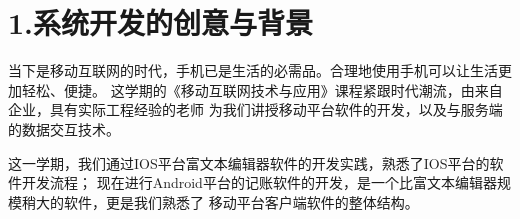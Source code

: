 \documentclass{article}
\begin{document}
\begin{mdtoc}
\begin{mdtocblock}
\begin{mdtocblock}

\begin{mdtocblock}%





\end{mdtocblock}%
\end{mdtocblock}%


\end{mdtocblock}%
\end{mdtoc}%

\mdhr{}%

\section{1.\hspace*{0.5em}系统开发的创意与背景}\label{section}%

\noindent{}当下是移动互联网的时代，手机已是生活的必需品。合理地使用手机可以让生活更加轻松、便捷。
这学期的《移动互联网技术与应用》课程紧跟时代潮流，由来自企业，具有实际工程经验的老师
为我们讲授移动平台软件的开发，以及与服务端的数据交互技术。%

这一学期，我们通过IOS平台富文本编辑器软件的开发实践，熟悉了IOS平台的软件开发流程；
现在进行Android平台的记账软件的开发，是一个比富文本编辑器规模稍大的软件，更是我们熟悉了
移动平台客户端软件的整体结构。%
\end{document}

